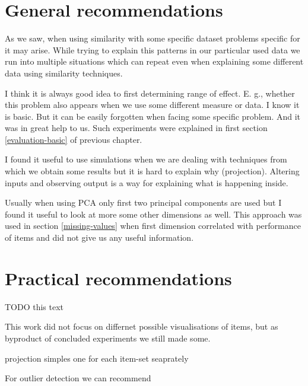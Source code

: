 \documentclass[
  digital, %
  table,   %
  nolof,     %
  nolot,     %
  nocover,
  color
]{fithesis3}
\begin{document}

\section{General recommendations}\label{general-recommendations}

As we saw, when using similarity with some specific dataset problems specific for it may arise. While trying to explain this patterns in our particular used data we run into multiple situations which can repeat even when explaining some different data using similarity techniques.


I think it is always good idea to first determining range of effect. E. g., whether this problem also appears when we use some different measure or data. I know it is basic. But it can be easily forgotten when facing some specific problem. And it was in great help to us. Such experiments were explained in first section \ref{evaluation-basic} of previous chapter.


I found it useful to use simulations when we are dealing with techniques from which we obtain some results but it is hard to explain why (projection). Altering inputs and observing output is a way for explaining what is happening inside.


Usually when using PCA only first two principal components are used but I found it useful to look at more some other dimensions as well. This approach was used in section \ref{missing-values} when first dimension correlated with performance of items and did not give us any useful information.

\section{Practical recommendations}\label{practical-recommendations}

TODO this text


This work did not focus on differnet possible visualisations of items, but as byproduct of concluded experiments we still made some.

projection
simples one
for each item-set seaprately



For outlier detection we can recommend
\end{document}
